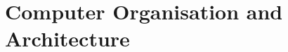 \documentclass{article}
\begin{document}
    \setcounter{section}{4}
    \section{Computer Organisation and Architecture}
    \setcounter{subsection}{24}
    
    
    
    
    
    
\end{document}
